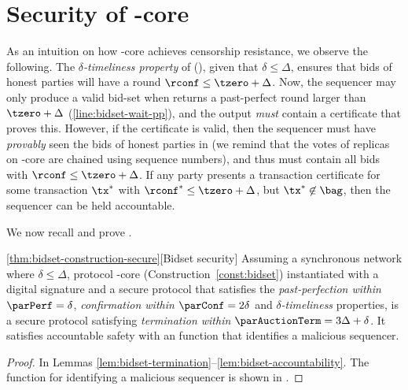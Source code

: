 \section{Security of \bidsettm-core}\label{app:bidsetsec}

As an intuition on how \bidsettm-core achieves censorship resistance, we observe the following.
The \emph{$\delta$-timeliness property} of \podtm (), given that $\delta \leq \Delta$, ensures that bids of honest parties will have a \confirmed round $\rconf \leq \tzero + \Delta$.
Now, the sequencer may only produce a valid bid-set when \podtm returns a past-perfect round larger than $\tzero + \Delta$ (\cref{line:bidset-wait-pp}), and the output \emph{must} contain a certificate \ppcert that proves this. However, if the certificate is valid, then the sequencer must have \emph{provably} seen the bids of honest parties in \txSet (we remind that the votes of replicas on \podtm-core are chained using sequence numbers), and thus \bag must contain all bids with $\rconf \leq \tzero + \Delta$. If any party presents a transaction certificate \txcert for some transaction $\tx^*$ with $\rconf^* \leq \tzero + \Delta$, but $\tx^* \not\in \bag$, then the sequencer can be held accountable.

We now recall and prove .

\begin{customthm}{\ref{thm:bidset-construction-secure}}[Bidset security]
    Assuming a synchronous network where $\delta \leq \Delta$,
    protocol \bidsettm-core (Construction~\ref{const:bidset}) instantiated with a digital signature and a secure \podtm protocol that satisfies the \emph{past-perfection within $\parPerf = \delta$}, \emph{confirmation within $\parConf=2\delta$} and \emph{$\delta$-timeliness} properties, is a secure \bidsettm protocol satisfying \emph{termination within $\parAuctionTerm = 3\Delta + \delta$}.
    It satisfies accountable safety with an \identifySequencer{} function that identifies a malicious sequencer.
\end{customthm}
\begin{proof}
	In Lemmas \ref{lem:bidset-termination}--\ref{lem:bidset-accountability}. The function for identifying a malicious sequencer is shown in .
\end{proof}

